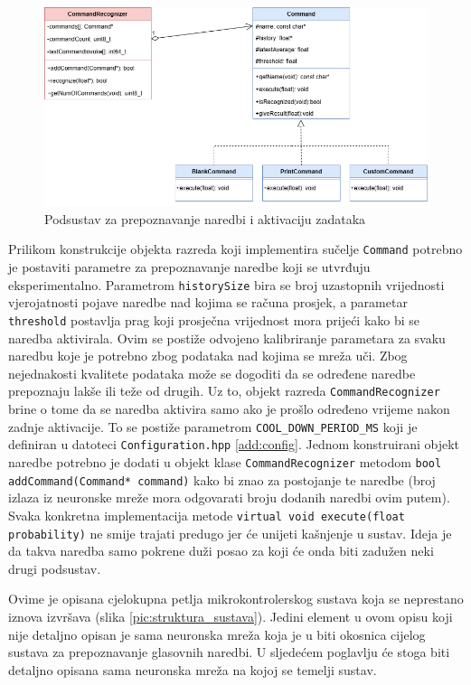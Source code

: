 \begin{figure}[htb]
    \centering
    \includegraphics[width=0.9\linewidth]{Chapters/struktura_sustava/prepoznavanje_naredbi/commands.png} 
    \caption{Podsustav za prepoznavanje naredbi i aktivaciju zadataka\cite{flowchart}}
    \label{pic:uml}
\end{figure}

Prilikom konstrukcije objekta razreda koji implementira sučelje \texttt{Command} potrebno je postaviti
parametre za prepoznavanje naredbe koji se utvrđuju eksperimentalno. Parametrom \texttt{historySize}
bira se broj uzastopnih vrijednosti vjerojatnosti pojave naredbe nad kojima se računa prosjek,
a parametar \texttt{threshold} postavlja prag koji prosječna vrijednost mora prijeći kako bi se naredba
aktivirala. Ovim se postiže odvojeno kalibriranje parametara za svaku naredbu koje je potrebno
zbog podataka nad kojima se mreža uči. Zbog nejednakosti kvalitete podataka može se dogoditi da se određene
naredbe prepoznaju lakše ili teže od drugih.
Uz to, objekt razreda \texttt{CommandRecognizer} brine o tome da se naredba aktivira
samo ako je prošlo određeno vrijeme nakon zadnje aktivacije. To se postiže parametrom 
\texttt{COOL\_DOWN\_PERIOD\_MS} koji je definiran u datoteci \texttt{Configuration.hpp} \ref{add:config}.
Jednom konstruirani objekt naredbe potrebno je dodati 
u objekt klase \texttt{CommandRecognizer} metodom \texttt{bool addCommand(Command* command)} 
kako bi znao za postojanje te naredbe (broj izlaza iz neuronske mreže mora odgovarati 
broju dodanih naredbi ovim putem). Svaka konkretna implementacija metode 
\texttt{virtual void execute(float probability)} ne smije trajati predugo jer će unijeti 
kašnjenje u sustav. Ideja je da takva naredba samo pokrene duži posao za koji će onda
biti zadužen neki drugi podsustav.

Ovime je opisana cjelokupna petlja mikrokontrolerskog sustava
koja se neprestano iznova izvršava (slika \ref{pic:struktura_sustava}).
Jedini element u ovom opisu koji nije detaljno opisan je sama neuronska mreža koja
je u biti okosnica cijelog sustava za prepoznavanje glasovnih naredbi. 
U sljedećem poglavlju će stoga biti detaljno opisana sama neuronska mreža na kojoj se temelji sustav.